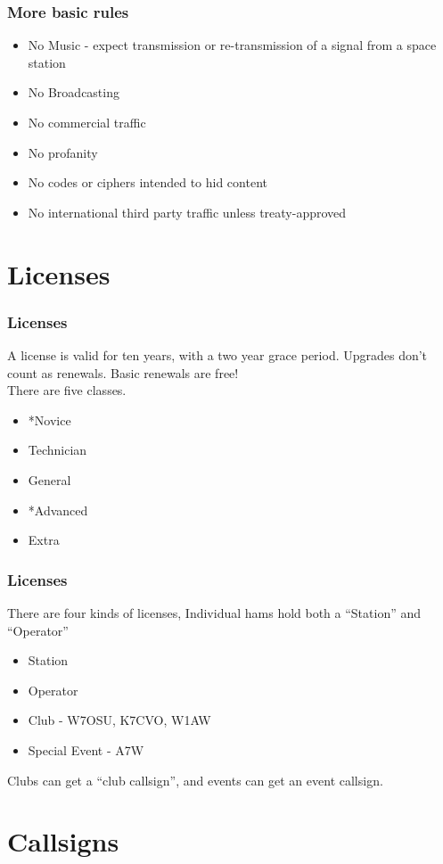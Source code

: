 \documentclass[10pt, handout]{beamer}
\begin{document}
\begin{frame}
\frametitle{More basic rules}
\begin{itemize}
\item No Music - expect transmission or re-transmission of a signal from a space station
\item No Broadcasting
\item No commercial traffic
\item No profanity
\item No codes or ciphers intended to hid content
\item No international third party traffic unless treaty-approved
\end{itemize}
\end{frame}

\section{Licenses}

\begin{frame}
\frametitle{Licenses}
A license is valid for ten years, with a two year grace period. Upgrades don't count as renewals. Basic renewals are free!\\
There are five classes.
\begin{itemize}
\item *Novice
\item Technician
\item General
\item *Advanced
\item Extra
\end{itemize}
\end{frame}

\begin{frame}
\frametitle{Licenses}
There are four kinds of licenses, Individual hams hold both a ``Station'' and ``Operator''
\begin{itemize}
\item Station
\item Operator
\item Club - W7OSU, K7CVO, W1AW
\item Special Event - A7W
\end{itemize}
Clubs can get a ``club callsign'', and events can get an event callsign.
\end{frame}

\section{Callsigns}
\end{document}
